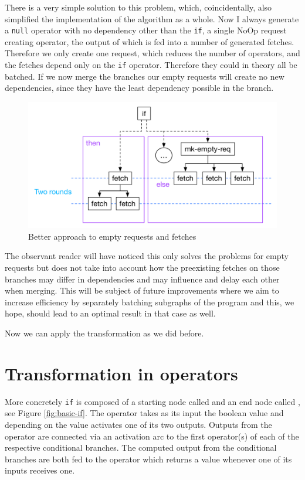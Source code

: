 There is a very simple solution to this problem, which, coincidentally, also simplified the implementation of the algorithm as a whole.
Now I always generate a \texttt{null} operator with no dependency other than the \texttt{if}, a single NoOp request creating operator, the output of which is fed into a number of generated fetches.
Therefore we only create one request, which reduces the number of operators, and the fetches depend only on the \texttt{if} operator.
Therefore they could in theory all be batched.
If we now merge the branches our empty requests will create no new dependencies, since they have the least dependency possible in the branch.

\begin{figure}
    \includegraphics[width=\linewidth]{../Figures/if-insert-empty-better-after-insert}
    \caption{Better approach to empty requests and fetches}
    \label{if-insert-empty-better-after-insert}
\end{figure}

The observant reader will have noticed this only solves the problems for empty requests but does not take into account how the preexisting fetches on those branches may differ in dependencies and may influence and delay each other when merging.
This will be subject of future improvements where we aim to increase efficiency by separately batching subgraphs of the program and this, we hope, should lead to an optimal result in that case as well.

Now we can apply the transformation as we did before.

\section{Transformation in operators}

More concretely \texttt{if} is composed of a starting node called \opite{} and an end node called \opselect{}, see Figure \ref{fig:basic-if}.
The \opite{} operator takes as its input the boolean value and depending on the value activates one of its two outputs.
Outputs from the \opite{} operator are connected via an activation arc to the first operator(s) of each of the respective conditional branches.
The computed output from the conditional branches are both fed to the \opselect{} operator which returns a value whenever one of its inputs receives one.

